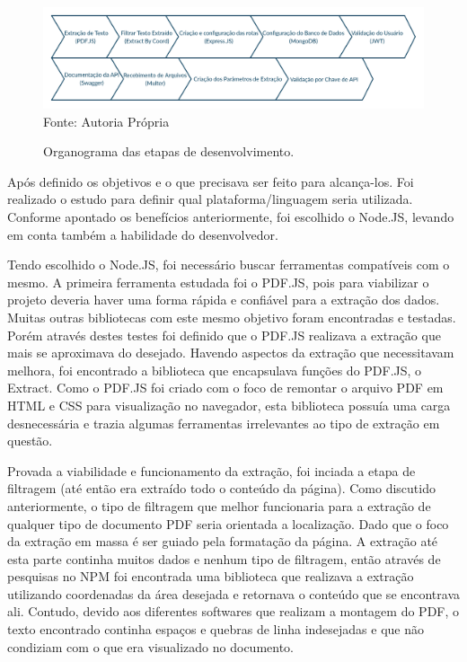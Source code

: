 \begin{figure}[H]
\centering
\captionsetup{justification   = raggedright,
              singlelinecheck = false}
\caption{Organograma das etapas de desenvolvimento.}\label{org}
\includegraphics[width=1\textwidth]{figs/organograma.png}
\footnotesize Fonte: Autoria Própria
\end{figure}

Após definido os objetivos e o que precisava ser feito para alcança-los. Foi realizado o estudo para definir qual plataforma/linguagem seria utilizada. Conforme apontado os benefícios anteriormente, foi escolhido o Node.JS, levando em conta também a habilidade do desenvolvedor.

Tendo escolhido o Node.JS, foi necessário buscar ferramentas compatíveis com o mesmo. A primeira ferramenta estudada foi o PDF.JS, pois para viabilizar o projeto deveria haver uma forma rápida e confiável para a extração dos dados. Muitas outras bibliotecas com este mesmo objetivo foram encontradas e testadas. Porém através destes testes foi definido que o PDF.JS realizava a extração que mais se aproximava do desejado.
Havendo aspectos da extração que necessitavam melhora, foi encontrado a biblioteca que encapsulava funções do PDF.JS, o Extract. Como o PDF.JS foi criado com o foco de remontar o arquivo PDF em HTML e CSS para visualização no navegador, esta biblioteca possuía uma carga desnecessária e trazia algumas ferramentas irrelevantes ao tipo de extração em questão.

Provada a viabilidade e funcionamento da extração, foi inciada a etapa de filtragem (até então era extraído todo o conteúdo da página). Como discutido anteriormente, o tipo de filtragem que melhor funcionaria para a extração de qualquer tipo de documento PDF seria orientada a localização. Dado que o foco da extração em massa é ser guiado pela formatação da página.
A extração até esta parte continha muitos dados e nenhum tipo de filtragem, então através de pesquisas no NPM foi encontrada uma biblioteca que realizava a extração utilizando coordenadas da área desejada e retornava o conteúdo que se encontrava ali.
Contudo, devido aos diferentes softwares que realizam a montagem do PDF, o texto encontrado continha espaços e quebras de linha indesejadas e que não condiziam com o que era visualizado no documento. 


